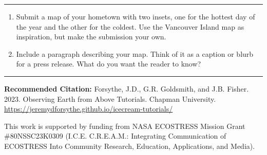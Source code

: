 \documentclass[oneside,a4paper,11pt,explicit]{book}
\begin{document}
\vspace{.25em}
	
\hrule

\vspace{1 em}
	
\begin{tcolorbox}[colback=yellow!5!white,colframe=IceCreamOrbit,title= \vspace{.2em} \Large Map of the Week Assignments]
	\large
	\begin{enumerate}
		\item Submit a map of your hometown with two insets, one for the hottest day of the year and the other for the coldest. Use the Vancouver Island map as inspiration, but make the submission your own.  
		\item Include a paragraph describing your map. Think of it as a caption or blurb for a press release. What do you want the reader to know?
	\end{enumerate}	
\end{tcolorbox}
	
\vfill
	
\hrule
	
\vspace{1em}
	
\textbf{Recommended Citation:} Forsythe, J.D., G.R. Goldsmith, and J.B. Fisher. 2023. Observing Earth from Above Tutorials. Chapman University. \url{https://jeremydforsythe.github.io/icecream-tutorials/}
	
\vspace{1em}
	
This work is supported by funding from NASA ECOSTRESS Mission Grant \#80NSSC23K0309 (I.C.E. C.R.E.A.M.: Integrating Communication of ECOSTRESS Into Community Research, Education, Applications, and Media).
	
\end{document}
